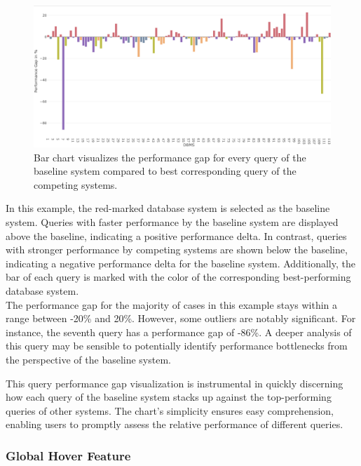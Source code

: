 \begin{figure}[h]
  \centering
  \includegraphics[width=1\linewidth]{figures/bsp-query-gaps.png}
  \caption{Bar chart visualizes the performance gap for every query of the baseline system compared to best corresponding query of the competing systems.}
  \label{fig:performance-gap}
\end{figure}

In this example, the red-marked database system is selected as the baseline system. Queries with faster performance by the baseline system are displayed above the baseline, indicating a positive performance delta. In contrast, queries with stronger performance by competing systems are shown below the baseline, indicating a negative performance delta for the baseline system. Additionally, the bar of each query is marked with the color of the corresponding best-performing database system.\\
The performance gap for the majority of cases in this example stays within a range between -20\% and 20\%. However, some outliers are notably significant. For instance, the seventh query has a performance gap of -86\%. A deeper analysis of this query may be sensible to potentially identify performance bottlenecks from the perspective of the baseline system.

This query performance gap visualization is instrumental in quickly discerning how each query of the baseline system stacks up against the top-performing queries of other systems. The chart's simplicity ensures easy comprehension, enabling users to promptly assess the relative performance of different queries.




\subsubsection{Global Hover Feature}\label{sec:hover-feature}

